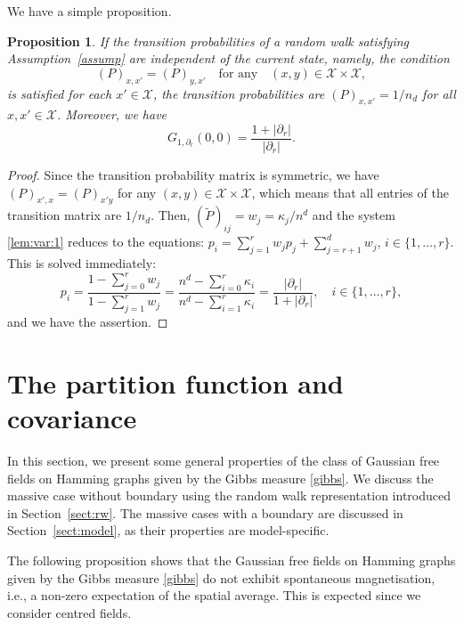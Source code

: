 \documentclass[a4paper,11pt]{article}
\theoremstyle{plain}
\newtheorem{proposition}[theorem]{Proposition}
\theoremstyle{definition}
\begin{document}
We have a simple proposition.

\begin{proposition}\label{prop:ind}
  If the transition probabilities of a random walk
  satisfying Assumption~\ref{assump} are independent of
  the current state, namely, the condition
  \begin{equation}\label{cor:ind:cond}
    (P)_{x,x'}=(P)_{y,x'} \quad \text{for~any}
    \quad (x,y) \in \mathcal{X}\times\mathcal{X},
  \end{equation}
  is satisfied for each $x'\in\mathcal{X}$,
  the transition probabilities are
  $(P)_{x,x'}=1/n_d$ for all $x,x'\in\mathcal{X}$.
  Moreover, we have
  \begin{equation}\label{cor:ind:G}
    G_{1,\partial_r}(0,0)
    =\frac{1+|\partial_r|}{|\partial_r|}.
  \end{equation}
\end{proposition}

\begin{proof}
  Since the transition probability matrix is symmetric,
  we have
  $(P)_{x',x}=(P)_{x'y}$ for any
  $(x,y) \in \mathcal{X}\times\mathcal{X}$,
  which means that all entries of the transition matrix 
  are $1/n_d$. Then, $(\tilde{P})_{ij}=w_j=\kappa_j/n^d$ and
  the system \eqref{lem:var:1} reduces to the equations:
  $p_i=\sum_{j=1}^rw_jp_j+\sum_{j=r+1}^dw_j$,
  $i \in\{1,\ldots,r\}$.
  This is solved immediately:
  \[
    p_i=\frac{1-\sum_{j=0}^r w_j}{1-\sum_{j=1}^r w_j}
    =\frac{n^d-\sum_{i=0}^r \kappa_i}
    {n^d-\sum_{i=1}^r \kappa_i}=\frac{|\partial_r|}{1+|\partial_r|},
    \quad i\in\{1,\ldots,r\},
  \]    
  and we have the assertion.
\end{proof}

\section{The partition function and covariance}
\label{sect:part}

In this section, we present some general properties
of the class of Gaussian free fields on Hamming graphs
given by the Gibbs measure \eqref{gibbs}. We discuss
the massive case without boundary using the random walk
representation introduced in Section~\ref{sect:rw}.
The massive cases with a boundary are discussed in
Section~\ref{sect:model}, as their properties are
model-specific.

The following proposition shows that the Gaussian free
fields on Hamming graphs given by the Gibbs measure
\eqref{gibbs} do not exhibit spontaneous magnetisation,
i.e., a non-zero expectation of the spatial average.
This is expected since we consider centred fields.
\end{document}
